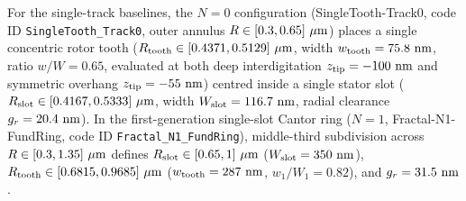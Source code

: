 \documentclass[pdflatex,sn-nature]{sn-jnl}
\begin{document}
For the single-track baselines, the $N=0$ configuration (SingleTooth-Track0, code ID \texttt{SingleTooth\_Track0}, outer annulus $R \in [0.3{}, 0.65{}]\ \mu\text{m}$) places a single concentric rotor tooth ($R_{\rm tooth} \in [0.4371, 0.5129]\ \mu\text{m}$, width $w_{\rm tooth} = 75.8{}\text{ nm}$, ratio $w/W = 0.65$, evaluated at both deep interdigitation $z_{\rm tip} = -100\text{ nm}$ and symmetric overhang $z_{\rm tip} = -55\text{ nm}$) centred inside a single stator slot ($R_{\rm slot} \in [\SingletoothTrackzeroSlotRInUm{}, \SingletoothTrackzeroSlotROutUm{}]\ \mu\text{m}$, width $W_{\rm slot} = 116.7{}\text{ nm}$, radial clearance $g_r = 20.4{}\text{ nm}$). In the first-generation single-slot Cantor ring ($N=1$, Fractal-N1-FundRing, code ID \texttt{Fractal\_N1\_FundRing}), middle-third subdivision across $R \in [\FractalNoneFundringRInUm{}, \FractalNoneFundringROutUm{}]\ \mu\text{m}$ defines $R_{\rm slot} \in [\FractalNoneFundringSlotRInUm{}, \FractalNoneFundringSlotROutUm{}]\ \mu\text{m}$ ($W_{\rm slot} = 350{}\text{ nm}$), $R_{\rm tooth} \in [0.6815, 0.9685]\ \mu\text{m}$ ($w_{\rm tooth} = 287{}\text{ nm}$, $w_1/W_1 = 0.82$), and $g_r = 31.5{}\text{ nm}$.
\end{document}
